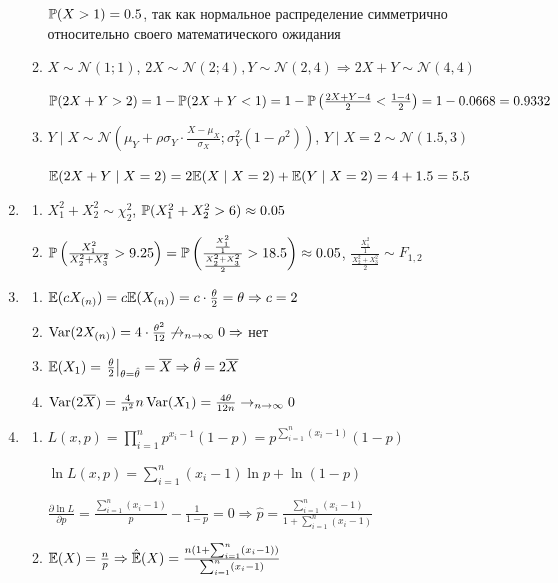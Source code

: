 \documentclass[12pt, a4paper]{article}\usepackage[]{graphicx}\usepackage[]{color}
\newcommand{\cN}{\mathcal{N}}
\begin{document}
\begin{enumerate}
\begin{enumerate}
$\P(X>1) = 0.5$, так как нормальное распределение симметрично относительно своего математического ожидания

\item $X \sim \cN (1;1)$, $2X \sim \cN(2; 4), Y \sim \cN(2, 4) \Rightarrow 2X+Y \sim \cN (4, 4)$

$\P(2X+Y > 2) = 1 - \P(2X+Y < 1) = 1 - \P\left(\frac{2X+Y - 4}{2} < \frac{1-4}{2}\right) = 1 - 0.0668 = 0.9332$

\item $Y \mid X \sim \cN\left(\mu_Y + \rho\sigma_Y\cdot\frac{X-\mu_X}{\sigma_X}; \sigma_Y^2(1-\rho^2)\right)$, $Y \mid X=2 \sim \cN(1.5, 3)$

$\E(2X+Y \mid X=2) = 2\E (X\mid X=2) + \E(Y\mid X=2) = 4 + 1.5 = 5.5$
\end{enumerate}

\item
\begin{enumerate}
\item $X_1^2 + X_2^2 \sim \chi^2_2$, $\P(X_1^2 + X_2^2 > 6)  \approx 0.05$
\item $\P\left(\frac{X_1^2}{X_2^2+X_3^2} > 9.25\right) = \P\left(\frac{\frac{X_1^2}{1}}{\frac{X_2^2+X_3^2}{2}} > 18.5\right) \approx 0.05$, $\frac{\frac{X_1^2}{1}}{\frac{X_2^2+X_3^2}{2}} \sim F_{1, 2}$
\end{enumerate}
\item
\begin{enumerate}
\item $\E(cX_{(n)}) = c \E(X_{(n)}) = c \cdot \frac{\theta}{2} = \theta \Rightarrow c=2$
\item $\Var(2X_{(n)}) = 4 \cdot \frac{\theta^2}{12} \not\to_{n\to\infty} 0 \Rightarrow$ нет
\item $\E(X_1) = \left. \frac{\theta}{2} \right|_{\theta = \hat{\theta}} = \overline{X} \Rightarrow \hat{\theta} = 2\overline{X}$
\item $\Var(2\overline{X}) = \frac{4}{n^2}n\Var(X_1) = \frac{4\theta}{12n} \to_{n\to\infty} 0$
\end{enumerate}
\item
\begin{enumerate}
\item $L(x, p) = \prod_{i=1}^n p^{x_i-1} (1-p) = p^{\sum_{i=1}^n(x_i-1)} (1-p)$

$\ln L (x, p) = \sum_{i=1}^n(x_i-1) \ln p  + \ln(1-p)$

$\frac{\partial \ln L}{\partial p} = \frac{\sum_{i=1}^n(x_i-1)}{p} - \frac{1}{1-p} = 0 \Rightarrow \hat{p} = \frac{\sum_{i=1}^n(x_i-1)}{1+\sum_{i=1}^n(x_i-1)}$
\item $\E(X) = \frac{n}{p} \Rightarrow \hat{\E}(X) = \frac{n(1 + \sum_{i=1}^n(x_i-1))}{\sum_{i=1}^n(x_i-1)}$
\end{enumerate}
\end{enumerate}
\end{document}
